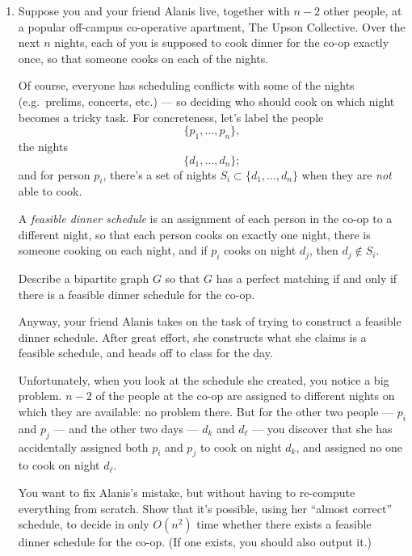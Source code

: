 \documentclass[12pt]{article}
\begin{document}
\begin{enumerate}
{}


\item

Suppose you and your friend Alanis live, together with $n-2$
other people, at a popular off-campus co-operative apartment,
The Upson Collective.
Over the next $n$ nights, each of you is supposed to cook
dinner for the co-op exactly once, so that someone
cooks on each of the nights.

Of course, everyone has scheduling conflicts with some of
the nights (e.g.~prelims, concerts, etc.) ---
so deciding who should cook on which night becomes a tricky task.
For concreteness, let's label the people
$$\{p_1, \ldots, p_n\},$$
the nights
$$\{d_1, \ldots, d_n\};$$
and for person $p_i$, there's a set of nights
$S_i \subset \{d_1, \ldots, d_n\}$
when they are {\em not} able to cook.

A {\em feasible dinner schedule} is an assignment of each
person in the co-op to a different night, so that
each person cooks on exactly one night,
there is someone cooking on each night,
and if $p_i$ cooks on night $d_j$, then $d_j \not\in S_i$.

Describe a bipartite graph $G$ so that $G$ has
a perfect matching if and only if there is
a feasible dinner schedule for the co-op.

Anyway, your friend Alanis takes on the task of trying to
construct a feasible dinner schedule.
After great effort, she constructs what she claims
is a feasible schedule, and heads off to class for the day.

Unfortunately, when you look at the schedule she created,
you notice a big problem.
$n-2$ of the people at the co-op are assigned to
different nights on which they are available: no problem there.
But for the other two people
--- $p_i$ and $p_j$ ---
and the other two days
--- $d_k$ and $d_\ell$ ---
you discover that she has accidentally
assigned both $p_i$ and $p_j$ to cook on night $d_k$,
and assigned no one to cook on night $d_\ell$.

You want to fix Alanis's mistake, but without having
to re-compute everything from scratch.
Show that it's possible, using her ``almost correct'' schedule,
to decide in only $O(n^2)$ time
whether there exists a feasible dinner schedule for the co-op.
(If one exists, you should also output it.)



\end{enumerate}
\end{document}
